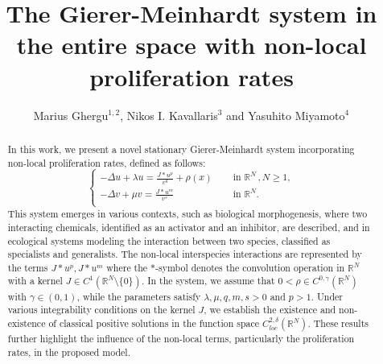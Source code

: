 \documentclass[leqno,12pt]{article}
\newcommand{\R}{\mathbb R}
\numberwithin{equation}{section}
\begin{document}
\title{The Gierer-Meinhardt system in the entire space with non-local proliferation rates} 

\author[ ]{Marius Ghergu$^{1,2}$, Nikos I. Kavallaris$^3$ and Yasuhito Miyamoto$^4$}

\affil[ ]{}

\affil[ ]{}




\maketitle

\begin{abstract} 
In this work, we present a novel stationary Gierer-Meinhardt system incorporating non-local proliferation rates, defined as follows:
$$
\begin{cases}
\displaystyle   -\Delta u+\lambda u=\frac{J*u^p}{v^q}+\rho(x) &\quad\mbox{ in }\R^N\, , N\geq 1,\\[0.1in]
\displaystyle  -\Delta v+\mu v=\frac{J*u^m}{v^s} &\quad\mbox{ in }\R^N.\\[0.1in]
\end{cases}
$$
This system emerges in various contexts, such as biological morphogenesis, where two interacting chemicals, identified as an activator and an inhibitor, are described, and in ecological systems modeling the interaction between two species, classified as specialists and generalists. The non-local interspecies interactions are represented by the terms $J*u^p, J*u^m$ where the $*$-symbol denotes the convolution operation in $\R^N$ with a kernel $J\in C^1(\R^N\setminus\{0\})$.
 In the system, we assume that $0<\rho\in C^{0, \gamma}(\R^N)$ with  $\gamma\in (0,1)$, while the parameters satisfy $\lambda, \mu, q,m,s>0$ and $p>1$.  Under various integrability conditions on the kernel 
$J$, we establish the existence and non-existence of classical positive solutions in the function space $C^{2, \delta}_{loc}(\R^N).$ These results further highlight the influence of the non-local terms, particularly the proliferation rates,  in the proposed model.
\end{abstract}
\end{document}
